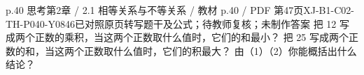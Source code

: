 \par\noindent\begin{minipage}{\linewidth}
\begin{bankitem}{p.40 思考}{第2章 / 2.1 相等关系与不等关系 / 教材 p.40 / PDF 第47页}{XJ-B1-C02-TH-P040-Y0846}{已对照原页转写题干及公式；待教师复核；未制作答案}
把 12 写成两个正数的乘积，当这两个正数取什么值时，它们的和最小？
把 25 写成两个正数的和，当这两个正数取什么值时，它们的积最大？
由（1）（2）你能概括出什么结论？
\end{bankitem}
\end{minipage}\par\medskip
